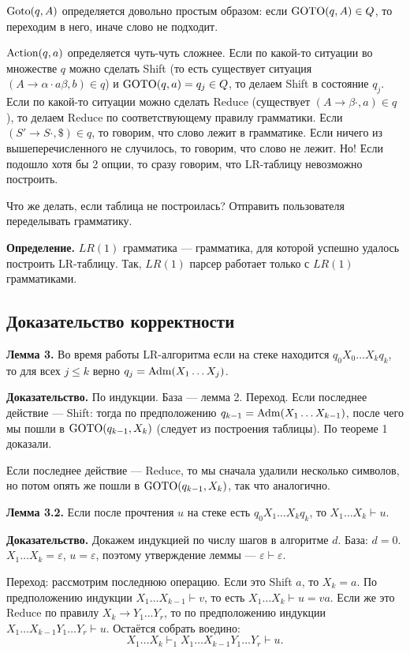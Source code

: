 $\operatorname{Goto}(q, A)$ определяется довольно простым образом: если $\operatorname{GOTO}(q, A) \in Q$, то переходим в него, иначе слово не подходит.

$\operatorname{Action}(q, a)$ определяется чуть-чуть сложнее. Если по какой-то ситуации во множестве $q$ можно сделать Shift (то есть существует ситуация $(A \to \alpha \cdot a \beta, b) \in q$) и $\operatorname{GOTO}(q, a) = q_j \in Q$, то делаем Shift в состояние $q_j$.
Если по какой-то ситуации можно сделать Reduce (существует $(A \to \beta \cdot, a) \in q$), то делаем Reduce по соответствующему правилу грамматики.
Если $(S' \to S \cdot, \$) \in q$, то говорим, что слово лежит в грамматике.
Если ничего из вышеперечисленного не случилось, то говорим, что слово не лежит.
Но! Если подошло хотя бы 2 опции, то сразу говорим, что LR-таблицу невозможно построить.

Что же делать, если таблица не построилась? Отправить пользователя переделывать грамматику.

\textbf{Определение.} $LR(1)$ грамматика --- грамматика, для которой успешно удалось построить LR-таблицу.
Так, $LR(1)$ парсер работает только с $LR(1)$ грамматиками.

\subsection{Доказательство корректности}
\textbf{Лемма 3.} Во время работы LR-алгоритма если на стеке находится $q_0X_0 \dots X_kq_k$, то для всех $j \le k$ верно $q_j = \operatorname{Adm}(X_1 \dots X_j)$.

\textbf{Доказательство.} По индукции. База --- лемма 2. Переход.
Если последнее действие --- Shift: тогда по предположению $q_{k-1} = \operatorname{Adm}(X_1 \dots X_{k-1})$, после чего мы пошли в $\operatorname{GOTO}(q_{k-1}, X_k)$ (следует из построения таблицы).
По теореме 1 доказали.

Если последнее действие --- Reduce, то мы сначала удалили несколько символов, но потом опять же пошли в $\operatorname{GOTO}(q_{k-1}, X_k)$, так что аналогично.

\QED

\textbf{Лемма 3.2.} Если после прочтения $u$ на стеке есть $q_0X_1 \dots X_k q_k$, то $X_1 \dots X_k \vdash u$.

\textbf{Доказательство.} Докажем индукцией по числу шагов в алгоритме $d$.
База: $d = 0$. $X_1 \dots X_k = \varepsilon$, $u = \varepsilon$, поэтому утверждение леммы --- $\varepsilon \vdash \varepsilon$.

Переход: рассмотрим последнюю операцию. Если это Shift $a$, то $X_k = a$.
По предположению индукции $X_1 \dots X_{k-1} \vdash v$, то есть $X_1 \dots X_k \vdash u = va$.
Если же это Reduce по правилу $X_k \to Y_1 \dots Y_r$, то по предположению индукции $X_1 \dots X_{k-1} Y_1 \dots Y_r \vdash u$.
Остаётся собрать воедино:
\[
    X_1 \dots X_{k} \vdash_1 X_1 \dots X_{k-1} Y_1 \dots Y_r \vdash u.
\]

